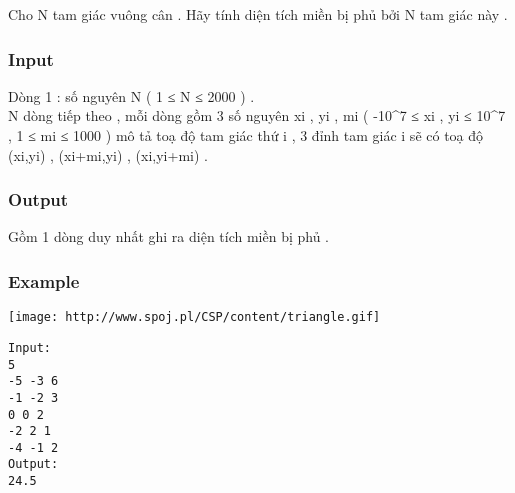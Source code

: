 



   Cho N tam giác vuông cân . Hãy tính diện tích miền bị phủ bởi N tam giác này .  

\subsubsection{   Input  }

   Dòng 1 : số nguyên N ( 1 ≤ N ≤ 2000 ) .   
\\   N dòng tiếp theo , mỗi dòng gồm 3 số nguyên xi , yi , mi (  -10\textasciicircum7 ≤ xi , yi ≤ 10\textasciicircum7 , 1 ≤ mi  ≤ 1000 ) mô tả toạ độ tam giác thứ i , 3 đỉnh tam giác i sẽ có toạ độ (xi,yi) , (xi+mi,yi) , (xi,yi+mi) .  

\subsubsection{   Output  }

   Gồm 1 dòng duy nhất ghi ra diện tích miền bị phủ .  

\subsubsection{   Example  }
\texttt{[image: http://www.spoj.pl/CSP/content/triangle.gif]}
\begin{verbatim}
Input:
5
-5 -3 6
-1 -2 3
0 0 2
-2 2 1
-4 -1 2
Output:
24.5
\end{verbatim}